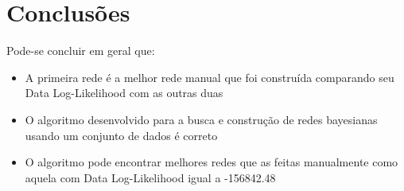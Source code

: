 \section{Conclusões}
	Pode-se concluir em geral que:\\
	\begin{itemize}
		\item A primeira rede é a melhor rede manual que foi construída comparando seu Data Log-Likelihood com as outras duas
		\item O algoritmo desenvolvido para a busca e construção de redes bayesianas usando um conjunto de dados é correto
		\item O algoritmo pode encontrar melhores redes que as feitas manualmente como aquela com Data Log-Likelihood igual a -156842.48
	\end{itemize}

\clearpage